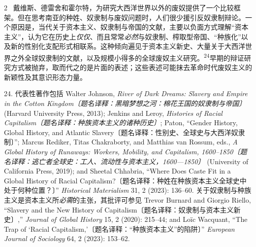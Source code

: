 \documentclass[10pt,a4paper]{article}
\begin{document}
\begin{paracol}{2}
\switchcolumn*
{\scriptsize\color{gray} [p. 6]}\ 戴维斯、德雷舍和霍尔特，为研究大西洋世界以外的废奴提供了一个比较框架。但在思考南亚的种姓、奴隶制与废奴问题时，人们很少援引反奴隶制辩论。一个原因是，当代关于资本主义、奴隶制与帝国的文献，主要以负面方式理解“资本主义”，认为它在历史上\textit{仅仅}、而且常常\textit{必然}与奴隶制、榨取型帝国、“种族化”以及新的性别化支配形式相联系。这种倾向遍见于资本主义新史、大量关于大西洋世界之外全球奴隶制的文献，以及规模小得多的全球废奴主义研\mbox{究。\textsuperscript{24}}早期的辩证研究方式被抛弃，取而代之的是片面的表述；这些表述可能抹去革命时代废奴主义的新颖性及其意识形态力量。\par{\small 24. 代表性著作包括 Walter Johnson, \textit{River of Dark Dreams: Slavery and Empire in the Cotton Kingdom〔题名译释：黑暗梦想之河：棉花王国的奴隶制与帝国〕} (Harvard University Press, 2013); Jenkins and Leroy, \textit{Histories of Racial Capitalism〔题名译释：种族资本主义的诸种历史〕}; Paton, “Gender History, Global History, and Atlantic Slavery〔题名译释：性别史、全球史与大西洋奴隶制〕”; Marcus Rediker, Titas Chakraborty, and Matthias van Rossum, eds., \textit{A Global History of Runaways: Workers, Mobility, and Capitalism, 1600–1850〔题名译释：逃亡者全球史：工人、流动性与资本主义，1600—1850〕} (University of California Press, 2019); and Sheetal Chhabria, “Where Does Caste Fit in a Global History of Racial Capitalism?〔题名译释：种姓在种族资本主义全球史中处于何种位置？〕” \textit{Historical Materialism} 31, 2 (2023): 136–60. 关于奴隶制与种族主义是资本主义所\textit{必需}的主张，其批评可参见 Trevor Burnard and Giorgio Riello, “Slavery and the New History of Capitalism〔题名译释：奴隶制与资本主义新史〕,” \textit{Journal of Global History} 15, 2 (2020): 215–44; and Loïc Wacquant, “The Trap of ‘Racial Capitalism,’〔题名译释：“种族资本主义”的陷阱〕” \textit{European Journal of Sociology} 64, 2 (2023): 153–62.\par}
\switchcolumn

\end{paracol}
\end{document}
